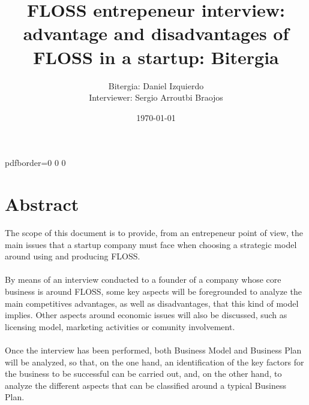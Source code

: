 \documentclass[11pt]{article}
\title{\textbf{FLOSS entrepeneur interview: advantage and disadvantages of FLOSS in a startup: Bitergia}}
\author{Bitergia: Daniel Izquierdo\\
Interviewer: Sergio Arroutbi Braojos}
\date{\today}
\newcounter{question}
\newcounter{answer}
\begin{document}
\newcommand\Que[1]{%
   \leavevmode\par
   \stepcounter{question}
   \noindent
   Q\thequestion. #1\par}
   
\newcommand\Ans[1]{%
   \stepcounter{answer}
   \noindent
   A\thequestion. #1\par}

\hypersetup
{   
pdfborder={0 0 0}
}

\maketitle

\tableofcontents

\pagebreak

\section{Abstract}
The scope of this document is to provide, from an entrepeneur point of view, the main issues that a startup company must face when choosing a strategic model around using and producing FLOSS.\\
\\
By means of an interview conducted to a founder of a company whose core business is around FLOSS, some key aspects will be foregrounded to analyze the main competitives advantages, as well as disadvantages, that this kind of model implies. Other aspects around economic issues will also be discussed, such as licensing model, marketing activities or comunity involvement.\\
\\
Once the interview has been performed, both Business Model and Business Plan will be analyzed, so that, on the one hand, an identification of the key factors for the business to be successful can be carried out, and, on the other hand, to analyze the different aspects that can be classified around a typical Business Plan.
\end{document}
